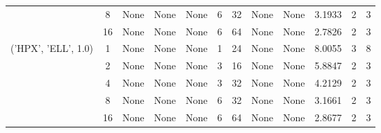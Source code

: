 \begin{tabular}{cccccccccccc}
& 8& None& None& None& 6& 32& None& None& 3.1933& 2& 3\\
& 16& None& None& None& 6& 64& None& None& 2.7826& 2& 3\\
\hline
\multirow{5}{*}{('HPX', 'ELL', 1.0)}& 1& None& None& None& 1& 24& None& None& 8.0055& 3& 8\\
& 2& None& None& None& 3& 16& None& None& 5.8847& 2& 3\\
& 4& None& None& None& 3& 32& None& None& 4.2129& 2& 3\\
& 8& None& None& None& 6& 32& None& None& 3.1661& 2& 3\\
& 16& None& None& None& 6& 64& None& None& 2.8677& 2& 3\\
\hline
\end{tabular}



